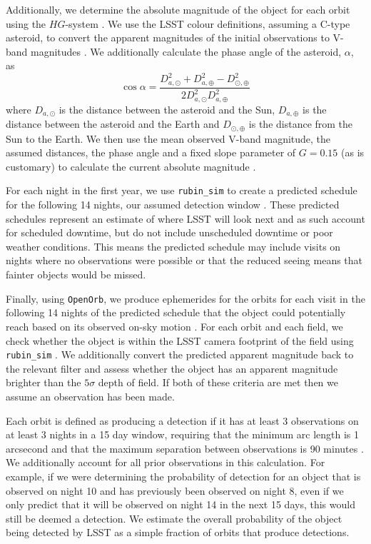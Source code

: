 \documentclass[twocolumn]{aastex631}
\begin{document}
Additionally, we determine the absolute magnitude of the object for each orbit using the $HG$-system \citep{mpc_h_g}. We use the LSST colour definitions, assuming a C-type asteroid, to convert the apparent magnitudes of the initial observations to V-band magnitudes \citep{Jones+2018}. We additionally calculate the phase angle of the asteroid, $\alpha$, as
\begin{equation}
    \cos \alpha = \frac{D_{a, \odot}^2 + D_{a, \oplus}^2 - D_{\odot, \oplus}^2}{2 D_{a, \odot}^2 D_{a, \oplus}^2}
\end{equation}
where $D_{a, \odot}$ is the distance between the asteroid and the Sun, $D_{a, \oplus}$ is the distance between the asteroid and the Earth and $D_{\odot, \oplus}$ is the distance from the Sun to the Earth. We then use the mean observed V-band magnitude, the assumed distances, the phase angle and a fixed slope parameter of $G = 0.15$ (as is customary) to calculate the current absolute magnitude \citep{mpc_h_g}.

For each night in the first year, we use \texttt{rubin\_sim} to create a predicted schedule for the following 14 nights, our assumed detection window \citep{rubin_sim}. These predicted schedules represent an estimate of where LSST will look next and as such account for scheduled downtime, but do not include unscheduled downtime or poor weather conditions. This means the predicted schedule may include visits on nights where no observations were possible or that the reduced seeing means that fainter objects would be missed.

Finally, using \texttt{OpenOrb}, we produce ephemerides for the orbits for each visit in the following 14 nights of the predicted schedule that the object could potentially reach based on its observed on-sky motion \citep{Granvik+2009}. For each orbit and each field, we check whether the object is within the LSST camera footprint of the field using \texttt{rubin\_sim} \citep{rubin_sim}. We additionally convert the predicted apparent magnitude back to the relevant filter and assess whether the object has an apparent magnitude brighter than the $5\sigma$ depth of field. If both of these criteria are met then we assume an observation has been made.

Each orbit is defined as producing a detection if it has at least 3 observations on at least 3 nights in a 15 day window, requiring that the minimum arc length is 1 arcsecond and that the maximum separation between observations is 90 minutes \citep{oss}. We additionally account for all prior observations in this calculation. For example, if we were determining the probability of detection for an object that is observed on night 10 and has previously been observed on night 8, even if we only predict that it will be observed on night 14 in the next 15 days, this would still be deemed a detection. We estimate the overall probability of the object being detected by LSST as a simple fraction of orbits that produce detections.
\end{document}
